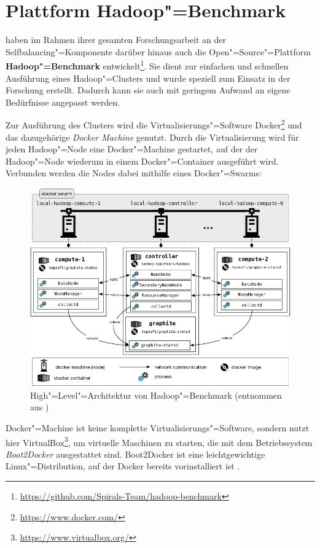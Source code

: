 \section{Plattform Hadoop"=Benchmark}
\label{sec:hadoopBenchmark}

\citeauthor{Zhang2016} haben im Rahmen ihrer gesamten Forschungsarbeit an der Selfbalancing"=Komponente darüber hinaus auch die Open"=Source"=Plattform \textbf{Hadoop"=Benchmark} entwickelt\footnote{\url{https://github.com/Spirals-Team/hadoop-benchmark}}.
Sie dient zur einfachen und schnellen Ausführung eines Hadoop"=Clusters und wurde speziell zum Einsatz in der Forschung erstellt.
Dadurch kann sie auch mit geringem Aufwand an eigene Bedürfnisse angepasst werden.

Zur Ausführung des Clusters wird die Virtualisierungs"=Software Docker\footnote{\url{https://www.docker.com/}} und das dazugehörige \emph{Docker Machine} genutzt.
Durch die Virtualisierung wird für jeden Hadoop"=Node eine Docker"=Machine gestartet, auf der der Hadoop"=Node wiederum in einem Docker"=Container ausgeführt wird.
Verbunden werden die Nodes dabei mithilfe eines Docker"=Swarms:

\begin{figure}[h]
    \includegraphics{./resources/hadoopBenchmarkArch.png}
    \caption[High"=Level"=Architektur von Hadoop"=Benchmark]
    {High"=Level"=Architektur von Hadoop"=Benchmark (entnommen aus \cite{abb:hadoopBenchmarkArch})}
    \label{fig:hadoopBenchmarkArchitecture}
\end{figure}

Docker"=Machine ist keine komplette Virtualisierungs"=Software, sondern nutzt hier VirtualBox\footnote{\url{https://www.virtualbox.org/}}, um virtuelle Maschinen zu starten, die mit dem Betriebssystem \emph{Boot2Docker} ausgestattet sind.
Boot2Docker ist eine leichtgewichtige Linux"=Distribution, auf der Docker bereits vorinstalliert ist \cite{DockerMachineGettingStartedVm}.

